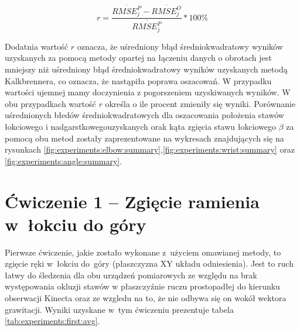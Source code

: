 \begin{equation}
	r = \frac{\overline{RMSE^P_j} - \overline{RMSE^O_j}}{\overline{RMSE^P_j}} * 100\%
	\label{eq:experiments:comparison}
\end{equation}

Dodatnia wartość $r$ oznacza, że uśredniony błąd średniokwadratowy wyników uzyskanych za pomocą metody opartej na łączeniu danych o obrotach jest mniejszy niż uśredniony błąd średniokwadratowy wyników uzyskanych metodą Kalkbrennera, co oznacza, że nastąpiła poprawa oszacowań. W przypadku wartości ujemnej mamy doczynienia z pogorszeniem uzyskiwanych wyników. W obu przypadkach wartość $r$ określa o ile procent zmieniły się wyniki. Porównanie uśrednionych błedów średniokwadratowych dla oszacowania położenia stawów łokciowego i nadgarstkowegouzyskanych orak kąta zgięcia stawu łokciowego $\beta$ za pomocą obu metod zostały zaprezentowane na wykresach znajdujących się na rysunkach \ref{fig:experiments:elbow:summary},\ref{fig:experiments:wrist:summary} oraz \ref{fig:experiments:angle:summary}.

\section*{Ćwiczenie 1 -- Zgięcie ramienia w~łokciu do góry}
Pierwsze ćwiczenie, jakie zostało wykonane z~użyciem omawianej metody, to zgięcie ręki w~łokciu do~góry (płaszczyzna XY układu odniesienia). Jest to ruch łatwy do śledzenia dla obu urządzeń pomiarowych ze względu na brak występowania okluzji stawów w płaszczyźnie ruczu prostopadłej do kierunku obserwacji Kinecta oraz ze wzgledu na to, że nie odbywa się on wokół wektora grawitacji. Wyniki uzyskane w~tym ćwiczeniu prezentuje tabela \ref{tab:experiments:first:avg}.

